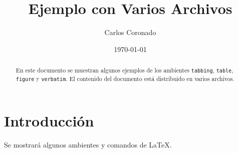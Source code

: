 \documentclass{article}            %
\author{Carlos Coronado}
\title{Ejemplo con Varios Archivos}
\date{\today}
\begin{document}

\maketitle                         %

\begin{abstract}                   %

  En este documento se muestran algunos ejemplos de los ambientes
  \texttt{tabbing}, \texttt{table}, \texttt{figure} y
  \texttt{verbatim}.  El contenido del documento est\'a distribuido en
  varios archivos.

\end{abstract}

\section{Introducci\'on}

  Se mostrar\'a algunos ambientes y comandos de \LaTeX.




\end{document}
